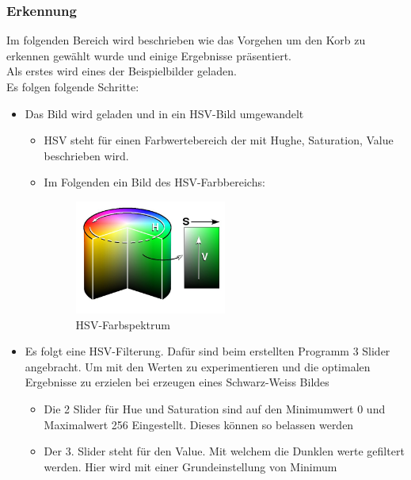 \subsubsection{Erkennung}
Im folgenden Bereich wird beschrieben wie das Vorgehen um den Korb zu erkennen 
gewählt wurde und einige Ergebnisse präsentiert.\\
%
Als erstes wird eines der Beispielbilder geladen.\\
%
Es folgen folgende Schritte:\\
%
\begin{itemize}
    \item Das Bild wird geladen und in ein HSV-Bild umgewandelt
    \begin{itemize}
        \item HSV steht für einen Farbwertebereich der mit Hughe, Saturation, 
            Value beschrieben wird.
        \item Im Folgenden ein Bild des HSV-Farbbereichs:\\
        \begin{figure}[h!]
            \centering
            \includegraphics[width=0.5\textwidth]{fig/HSV_cylinder.jpg}
            \caption{HSV-Farbspektrum}
            \label{fig:HSV-Farbspektrum}
        \end{figure}
    \end{itemize}
    \item Es folgt eine HSV-Filterung. Dafür sind beim erstellten Programm 3 
        Slider angebracht. Um mit den Werten zu experimentieren und die 
        optimalen Ergebnisse zu erzielen bei erzeugen eines Schwarz-Weiss Bildes
    \begin{itemize}
        \item Die 2 Slider für Hue und Saturation sind auf den Minimumwert 0 
            und Maximalwert 256 Eingestellt. Dieses können so belassen werden
        \item Der 3. Slider steht für den Value. Mit welchem die Dunklen werte 
            gefiltert werden. Hier wird mit einer Grundeinstellung von Minimum 

\end{itemize}
\end{itemize}
